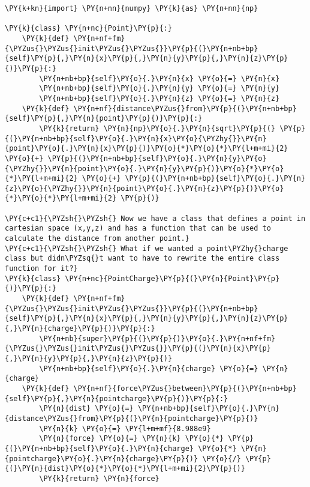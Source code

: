     \begin{tcolorbox}[breakable, size=fbox, boxrule=1pt, pad at break*=1mm,colback=cellbackground, colframe=cellborder]
\begin{Verbatim}[commandchars=\\\{\}]
\PY{k+kn}{import} \PY{n+nn}{numpy} \PY{k}{as} \PY{n+nn}{np}

\PY{k}{class} \PY{n+nc}{Point}\PY{p}{:}
    \PY{k}{def} \PY{n+nf+fm}{\PYZus{}\PYZus{}init\PYZus{}\PYZus{}}\PY{p}{(}\PY{n+nb+bp}{self}\PY{p}{,}\PY{n}{x}\PY{p}{,}\PY{n}{y}\PY{p}{,}\PY{n}{z}\PY{p}{)}\PY{p}{:}
        \PY{n+nb+bp}{self}\PY{o}{.}\PY{n}{x} \PY{o}{=} \PY{n}{x}
        \PY{n+nb+bp}{self}\PY{o}{.}\PY{n}{y} \PY{o}{=} \PY{n}{y}
        \PY{n+nb+bp}{self}\PY{o}{.}\PY{n}{z} \PY{o}{=} \PY{n}{z}
    \PY{k}{def} \PY{n+nf}{distance\PYZus{}from}\PY{p}{(}\PY{n+nb+bp}{self}\PY{p}{,}\PY{n}{point}\PY{p}{)}\PY{p}{:}
        \PY{k}{return} \PY{n}{np}\PY{o}{.}\PY{n}{sqrt}\PY{p}{(} \PY{p}{(}\PY{n+nb+bp}{self}\PY{o}{.}\PY{n}{x}\PY{o}{\PYZhy{}}\PY{n}{point}\PY{o}{.}\PY{n}{x}\PY{p}{)}\PY{o}{*}\PY{o}{*}\PY{l+m+mi}{2} \PY{o}{+} \PY{p}{(}\PY{n+nb+bp}{self}\PY{o}{.}\PY{n}{y}\PY{o}{\PYZhy{}}\PY{n}{point}\PY{o}{.}\PY{n}{y}\PY{p}{)}\PY{o}{*}\PY{o}{*}\PY{l+m+mi}{2} \PY{o}{+} \PY{p}{(}\PY{n+nb+bp}{self}\PY{o}{.}\PY{n}{z}\PY{o}{\PYZhy{}}\PY{n}{point}\PY{o}{.}\PY{n}{z}\PY{p}{)}\PY{o}{*}\PY{o}{*}\PY{l+m+mi}{2} \PY{p}{)}

\PY{c+c1}{\PYZsh{}\PYZsh{} Now we have a class that defines a point in cartesian space (x,y,z) and has a function that can be used to calculate the distance from another point.}
\PY{c+c1}{\PYZsh{}\PYZsh{} What if we wanted a point\PYZhy{}charge class but didn\PYZsq{}t want to have to rewrite the entire class function for it?}
\PY{k}{class} \PY{n+nc}{PointCharge}\PY{p}{(}\PY{n}{Point}\PY{p}{)}\PY{p}{:}
    \PY{k}{def} \PY{n+nf+fm}{\PYZus{}\PYZus{}init\PYZus{}\PYZus{}}\PY{p}{(}\PY{n+nb+bp}{self}\PY{p}{,}\PY{n}{x}\PY{p}{,}\PY{n}{y}\PY{p}{,}\PY{n}{z}\PY{p}{,}\PY{n}{charge}\PY{p}{)}\PY{p}{:}
        \PY{n+nb}{super}\PY{p}{(}\PY{p}{)}\PY{o}{.}\PY{n+nf+fm}{\PYZus{}\PYZus{}init\PYZus{}\PYZus{}}\PY{p}{(}\PY{n}{x}\PY{p}{,}\PY{n}{y}\PY{p}{,}\PY{n}{z}\PY{p}{)}
        \PY{n+nb+bp}{self}\PY{o}{.}\PY{n}{charge} \PY{o}{=} \PY{n}{charge}
    \PY{k}{def} \PY{n+nf}{force\PYZus{}between}\PY{p}{(}\PY{n+nb+bp}{self}\PY{p}{,}\PY{n}{pointcharge}\PY{p}{)}\PY{p}{:}
        \PY{n}{dist} \PY{o}{=} \PY{n+nb+bp}{self}\PY{o}{.}\PY{n}{distance\PYZus{}from}\PY{p}{(}\PY{n}{pointcharge}\PY{p}{)}
        \PY{n}{k} \PY{o}{=} \PY{l+m+mf}{8.988e9}
        \PY{n}{force} \PY{o}{=} \PY{n}{k} \PY{o}{*} \PY{p}{(}\PY{n+nb+bp}{self}\PY{o}{.}\PY{n}{charge} \PY{o}{*} \PY{n}{pointcharge}\PY{o}{.}\PY{n}{charge}\PY{p}{)} \PY{o}{/} \PY{p}{(}\PY{n}{dist}\PY{o}{*}\PY{o}{*}\PY{l+m+mi}{2}\PY{p}{)}
        \PY{k}{return} \PY{n}{force}


\end{Verbatim}
\end{tcolorbox}
